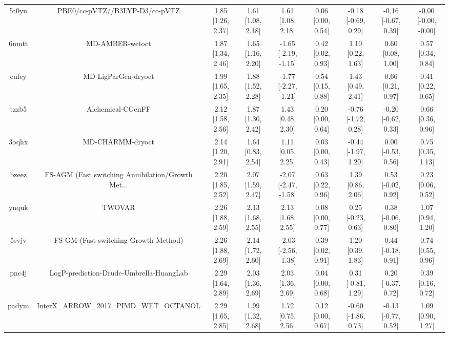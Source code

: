 \documentclass{article}
\begin{document}
\begin{center}
\begin{longtable}{|ccccccccc|}
 5t0yn &                     PBE0/cc-pVTZ//B3LYP-D3/cc-pVTZ &  1.85 [1.26, 2.37] &  1.61 [1.08, 2.18] &     1.61 [1.08, 2.18] &  0.06 [0.00, 0.54] &  -0.18 [-0.69, 0.29] &  -0.16 [-0.67, 0.39] &  -0.00 [-0.00, -0.00] \\
 6nmtt &                                    MD-AMBER-wetoct &  1.87 [1.34, 2.46] &  1.65 [1.16, 2.20] &  -1.65 [-2.19, -1.15] &  0.42 [0.02, 0.93] &    1.10 [0.22, 1.63] &    0.60 [0.08, 1.00] &     0.57 [0.34, 0.84] \\
 eufcy &                                MD-LigParGen-dryoct &  1.99 [1.65, 2.35] &  1.88 [1.52, 2.28] &  -1.77 [-2.27, -1.21] &  0.54 [0.15, 0.88] &    1.43 [0.49, 2.41] &    0.66 [0.21, 0.97] &     0.41 [0.22, 0.65] \\
 tzzb5 &                                  Alchemical-CGenFF &  2.12 [1.58, 2.56] &  1.87 [1.30, 2.42] &     1.43 [0.48, 2.30] &  0.20 [0.00, 0.64] &  -0.76 [-1.72, 0.28] &  -0.20 [-0.62, 0.33] &     0.66 [0.36, 0.96] \\
 3oqhx &                                   MD-CHARMM-dryoct &  2.14 [1.20, 2.91] &  1.64 [0.83, 2.54] &     1.11 [0.05, 2.25] &  0.03 [0.00, 0.43] &  -0.44 [-1.97, 1.20] &   0.00 [-0.53, 0.56] &     0.75 [0.35, 1.13] \\
 bzeez &  FS-AGM (Fast switching Annihilation/Growth Met... &  2.20 [1.85, 2.52] &  2.07 [1.59, 2.47] &  -2.07 [-2.47, -1.58] &  0.63 [0.22, 0.96] &    1.39 [0.86, 2.06] &   0.53 [-0.02, 0.92] &     0.23 [0.06, 0.52] \\
 ynquk &                                             TWOVAR &  2.26 [1.88, 2.59] &  2.13 [1.68, 2.55] &     2.13 [1.68, 2.55] &  0.08 [0.00, 0.77] &   0.25 [-0.23, 0.63] &   0.38 [-0.06, 0.80] &     1.07 [0.94, 1.20] \\
 5svjv &               FS-GM (Fast switching Growth Method) &  2.26 [1.88, 2.69] &  2.14 [1.72, 2.60] &  -2.03 [-2.56, -1.38] &  0.39 [0.02, 0.91] &    1.20 [0.39, 1.83] &   0.44 [-0.18, 0.91] &     0.74 [0.55, 0.96] \\
 pnc4j &            LogP-prediction-Drude-Umbrella-HuangLab &  2.29 [1.64, 2.89] &  2.03 [1.36, 2.69] &     2.03 [1.36, 2.69] &  0.04 [0.00, 0.68] &   0.31 [-0.81, 1.29] &   0.20 [-0.37, 0.72] &     0.39 [0.16, 0.72] \\
 padym &            InterX\_ARROW\_2017\_PIMD\_WET\_OCTANOL &  2.29 [1.65, 2.85] &  1.99 [1.32, 2.68] &     1.72 [0.75, 2.56] &  0.12 [0.00, 0.67] &  -0.60 [-1.86, 0.73] &  -0.13 [-0.77, 0.52] &     1.09 [0.90, 1.27] \\

\end{longtable}
\end{center}
\end{document}

